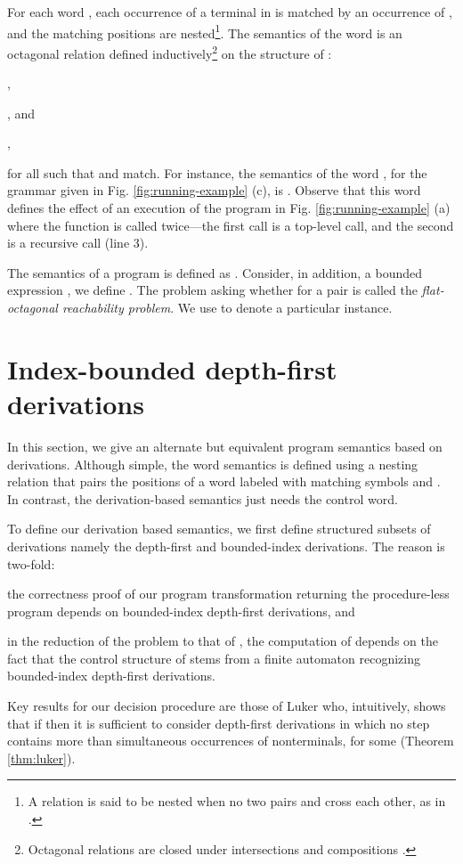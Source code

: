 \documentclass[final]{llncs}
\begin{document}
\smallskip
{} For each word , each occurrence of a
terminal  in  is matched by an occurrence
of , and the matching positions are nested\footnote{A
relation 
is said to be nested \cite{alur-jacm09} when no two pairs  and  cross each other, as in . }. The semantics of the word  is an octagonal
relation defined inductively\footnote{Octagonal relations are closed under intersections and compositions \cite{mine}.} on the
structure of :
\begin{inparaenum}
\item , 
\item , and
\item ,
\end{inparaenum}
for all  such that  and  match. For instance, the
semantics of the word
, for the grammar  given in Fig. \ref{fig:running-example} (c), is 
. Observe that this word defines the effect of 
an execution of the program in Fig. \ref{fig:running-example} (a)
where the function  is called twice---the first call is
a top-level call, and the second is a recursive call (line 3).

\smallskip
{}
The semantics of a program  is
defined as . Consider, in addition, a bounded
expression , we
define .  The problem asking
whether 
for a pair  is called
the \emph{flat-octagonal reachability problem}.
We use   to denote
a particular instance. 


\section{Index-bounded depth-first derivations}\label{sec:dfkderiv}

In this section, we give an alternate but equivalent program semantics
based on derivations.  Although simple, the word semantics is defined
using a nesting relation that pairs the positions of a word labeled
with matching symbols  and . In contrast,
the derivation-based semantics just needs the control word.

To define our derivation based semantics, we first define structured
subsets of derivations namely the depth-first and bounded-index
derivations. The reason is two-fold:
\begin{inparaenum}
\item the correctness proof of our program transformation \cite{gik13} 
      returning the procedure-less program  depends on
	bounded-index depth-first derivations, and
\item in the reduction of the  problem to
	that of , the computation
	of  depends on the fact that the control structure
	of  stems from a finite automaton recognizing
	bounded-index depth-first derivations.
\end{inparaenum}
Key results for our decision procedure are those of
Luker \cite{Luker78,Luker80} who, intuitively, shows that
if  then it is sufficient to consider
depth-first derivations in which no step contains more than 
simultaneous occurrences of nonterminals, for some 
(Theorem \ref{thm:luker}). 
\end{document}
